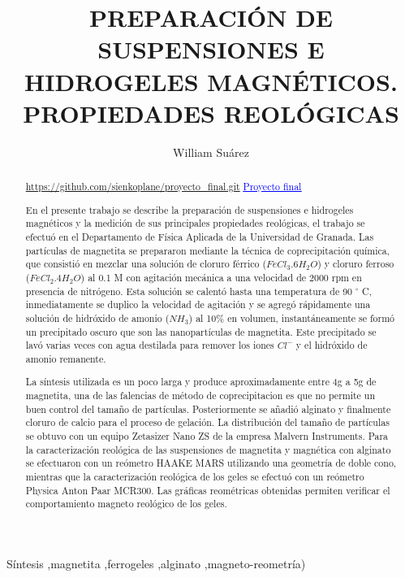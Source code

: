 \documentclass[review]{elsarticle}
\begin{document}
\begin{frontmatter}
\title{PREPARACI\'ON DE SUSPENSIONES E HIDROGELES MAGN\'ETICOS. PROPIEDADES REOL\'OGICAS}


\author[a]{William Su\'arez}
\address[a]{Afiliaci\'on X1.}



\begin{abstract}

\textcolor{cyan}{\underline{\url{https://github.com/sienkoplane/proyecto_final.git}}}
\href{https://github.com/sienkoplane/proyecto_final.git}{\textcolor{blue}{\underline{Proyecto final}}}

En el presente trabajo se describe la preparaci\'on de suspensiones e hidrogeles magn\'eticos y la medici\'on de sus principales propiedades reol\'ogicas, el trabajo se efectu\'o en el Departamento de F\'isica Aplicada de la Universidad de Granada. Las part\'iculas de magnetita se prepararon mediante la t\'ecnica de coprecipitaci\'on qu\'imica, que consisti\'o en mezclar una soluci\'on de cloruro f\'errico ($Fe Cl_{3} .6 H_{2}O$) y cloruro ferroso ($Fe Cl_{2} .4 H_{2}O$) al 0.1 M con agitaci\'on mec\'anica a una velocidad de 2000 rpm en presencia de nitr\'ogeno. Esta soluci\'on se calent\'o hasta una temperatura de 90 {\ensuremath{{}^\circ}} C, inmediatamente se duplico la velocidad de agitaci\'on y se agreg\'o r\'apidamente una soluci\'on de hidr\'oxido de amonio ($NH_3$) al 10\% en volumen, instant\'aneamente se form\'o un precipitado oscuro que son las nanopart\'iculas de magnetita.
Este precipitado se lav\'o varias veces con agua destilada para remover los iones $C l^{ -}$ y el hidr\'oxido de amonio remanente.

La s\'intesis utilizada es un poco larga y produce aproximadamente entre 4g a 5g de magnetita, una de las falencias de m\'etodo de coprecipitacion es que no permite un buen control del tama\~no de part\'iculas. Posteriormente se a\~nadi\'o alginato y finalmente cloruro de calcio para el proceso de gelaci\'on. La distribuci\'on del tama\~no de part\'iculas se obtuvo con un equipo Zetasizer Nano ZS de la empresa Malvern Instruments. Para la caracterizaci\'on reol\'ogica de las suspensiones de magnetita y magn\'etica con alginato se efectuaron con un re\'ometro HAAKE MARS utilizando una geometr\'ia de doble cono, mientras que la caracterizaci\'on reol\'ogica de los geles se efectu\'o con un re\'ometro Physica Anton Paar MCR300. Las gr\'aficas reom\'etricas obtenidas permiten verificar
el comportamiento magneto reol\'ogico de los geles.

\end{abstract}

\begin{keyword}
S\'intesis \sep magnetita \sep ferrogeles \sep alginato \sep magneto-reometr\'ia)
\end{keyword}

\end{frontmatter}
\end{document}
